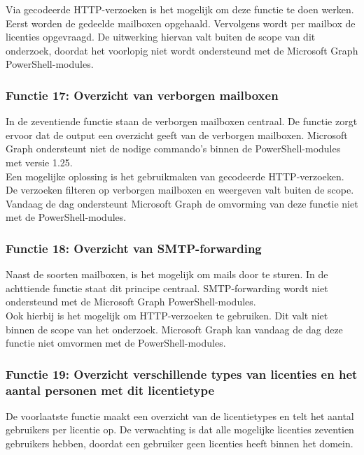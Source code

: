 Via gecodeerde \ac{HTTP}-verzoeken is het mogelijk om deze functie te doen werken. Eerst worden de gedeelde mailboxen opgehaald. Vervolgens wordt per mailbox de licenties opgevraagd. De uitwerking hiervan valt buiten de scope van dit onderzoek, doordat het voorlopig niet wordt ondersteund met de Microsoft Graph PowerShell-modules.

\subsubsection{Functie 17: Overzicht van verborgen mailboxen}


In de zeventiende functie staan de verborgen mailboxen centraal. De functie zorgt ervoor dat de output een overzicht geeft van de verborgen mailboxen. Microsoft Graph ondersteunt niet de nodige commando's binnen de PowerShell-modules met versie 1.25. \\ 

Een mogelijke oplossing is het gebruikmaken van gecodeerde \ac{HTTP}-verzoeken. De verzoeken filteren op verborgen mailboxen en weergeven valt buiten de scope. Vandaag de dag ondersteunt Microsoft Graph de omvorming van deze functie niet met de PowerShell-modules.

\subsubsection{Functie 18: Overzicht van SMTP-forwarding}


Naast de soorten mailboxen, is het mogelijk om mails door te sturen. In de achttiende functie staat dit principe centraal. \Ac{SMTP}-forwarding wordt niet ondersteund met de Microsoft Graph PowerShell-modules. \\

Ook hierbij is het mogelijk om \Ac{HTTP}-verzoeken te gebruiken. Dit valt niet binnen de scope van het onderzoek. Microsoft Graph kan vandaag de dag deze functie niet omvormen met de PowerShell-modules.

\subsubsection{Functie 19: Overzicht verschillende types van licenties en het aantal personen met dit licentietype}


De voorlaatste functie maakt een overzicht van de licentietypes en telt het aantal gebruikers per licentie op. De verwachting is dat alle mogelijke licenties zeventien gebruikers hebben, doordat een gebruiker geen licenties heeft binnen het domein. \\

